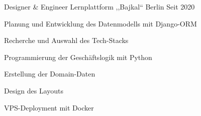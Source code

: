 
\begin{cventries}

  \cventry
  {Designer \& Engineer} %
  {Lernplattform ,,Bajkal``} %
  {Berlin} %
  {Seit 2020} %
  {
    \begin{cvitems} %
    \item {Planung und Entwicklung des Datenmodells mit Django-ORM}
    \item {Recherche und Auswahl des Tech-Stacks}
    \item {Programmierung der Geschäftslogik mit Python}
    \item {Erstellung der Domain-Daten}
    \item {Design des Layouts}
    \item {VPS-Deployment mit Docker}
    \end{cvitems}
  }

\end{cventries}
